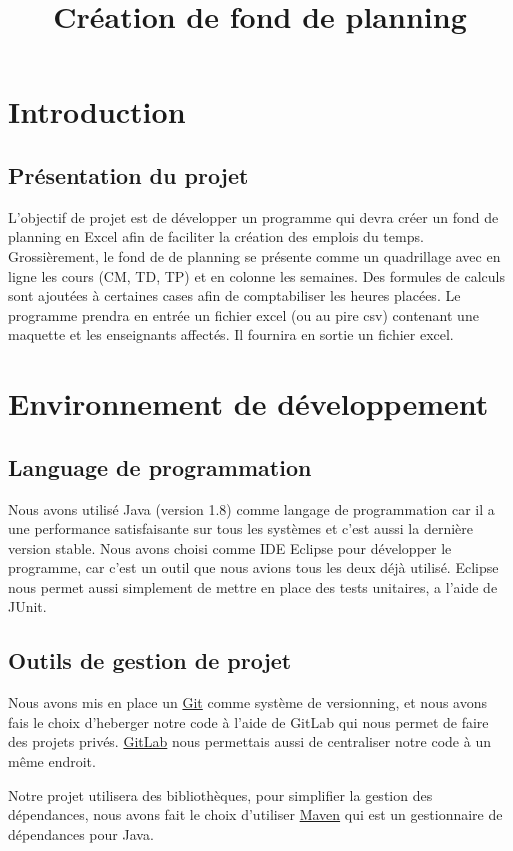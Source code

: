 \documentclass{polytech/polytech}
\title{Création de fond de planning}
\begin{document}
	\chapter{Introduction}
	\section{Présentation du projet}
	L’objectif de projet est de développer un programme qui devra créer un fond de planning en Excel afin de faciliter la création des emplois du temps.
	Grossièrement, le fond de de planning se présente comme un quadrillage avec en ligne les cours (CM, TD, TP) et en colonne les semaines.
	Des formules de calculs sont ajoutées à certaines cases afin de comptabiliser les heures placées.
	Le programme prendra en entrée un fichier excel (ou au pire csv) contenant une maquette et les enseignants affectés. Il fournira en sortie un fichier excel.
	
	\chapter{Environnement de développement}
	\section{Language de programmation}
	Nous avons utilisé Java (version 1.8) comme langage de programmation car il a une performance satisfaisante sur tous les systèmes et c'est aussi la dernière version stable.
	Nous avons choisi comme IDE Eclipse pour développer le programme, car c'est un outil que nous avions tous les deux déjà utilisé.
	Eclipse nous permet aussi simplement de mettre en place des tests unitaires, a l'aide de JUnit.

	\clearpage
	
	\section{Outils de gestion de projet}
	
	Nous avons mis en place un \href{https://git-scm.com/}{Git} comme système de versionning, et nous avons fais le choix d'heberger notre code à l'aide de GitLab qui nous permet de faire des projets privés.
	\href{https://about.gitlab.com/}{GitLab} nous permettais aussi de centraliser notre code à un même endroit.
	
	Notre projet utilisera des bibliothèques, pour simplifier la gestion des dépendances, nous avons fait le choix d'utiliser \href{https://maven.apache.org/}{Maven} qui est un gestionnaire de dépendances pour Java.
	
\end{document}
